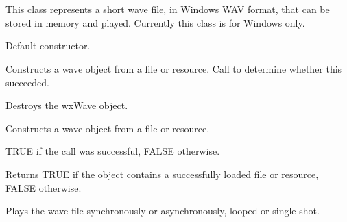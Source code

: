 \section{}\label{wxwave}

This class represents a short wave file, in Windows WAV format, that
can be stored in memory and played. Currently this class is for Windows
only.




\label{wxwaveconstr}


Default constructor.


Constructs a wave object from a file or resource. Call  to
determine whether this succeeded.






Destroys the wxWave object.

\label{wxwavecreate}


Constructs a wave object from a file or resource.





TRUE if the call was successful, FALSE otherwise.

\label{wxwaveisok}


Returns TRUE if the object contains a successfully loaded file or resource, FALSE otherwise.

\label{wxwaveplay}


Plays the wave file synchronously or asynchronously, looped or single-shot.


